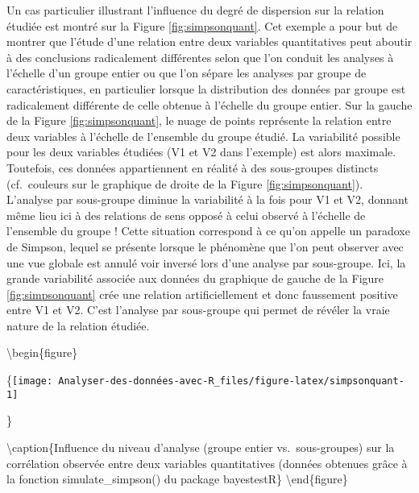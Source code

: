 \documentclass[
  french,
]{book}
\begin{document}
Un cas particulier illustrant l'influence du degré de dispersion sur la relation étudiée est montré sur la Figure \ref{fig:simpsonquant}. Cet exemple a pour but de montrer que l'étude d'une relation entre deux variables quantitatives peut aboutir à des conclusions radicalement différentes selon que l'on conduit les analyses à l'échelle d'un groupe entier ou que l'on sépare les analyses par groupe de caractéristiques, en particulier lorsque la distribution des données par groupe est radicalement différente de celle obtenue à l'échelle du groupe entier. Sur la gauche de la Figure \ref{fig:simpsonquant}, le nuage de points représente la relation entre deux variables à l'échelle de l'ensemble du groupe étudié. La variabilité possible pour les deux variables étudiées (V1 et V2 dans l'exemple) est alors maximale. Toutefois, ces données appartiennent en réalité à des sous-groupes distincts (cf.~couleurs sur le graphique de droite de la Figure \ref{fig:simpsonquant}). L'analyse par sous-groupe diminue la variabilité à la fois pour V1 et V2, donnant même lieu ici à des relations de sens opposé à celui observé à l'échelle de l'ensemble du groupe ! Cette situation correspond à ce qu'on appelle un paradoxe de Simpson, lequel se présente lorsque le phénomène que l'on peut observer avec une vue globale est annulé voir inversé lors d'une analyse par sous-groupe. Ici, la grande variabilité associée aux données du graphique de gauche de la Figure \ref{fig:simpsonquant} crée une relation artificiellement et donc faussement positive entre V1 et V2. C'est l'analyse par sous-groupe qui permet de révéler la vraie nature de la relation étudiée.

\textbackslash begin\{figure\}

\{\centering \texttt{[image: Analyser-des-données-avec-R\_files/figure-latex/simpsonquant-1]}

\}

\textbackslash caption\{Influence du niveau d'analyse (groupe entier vs.~sous-groupes) sur la corrélation observée entre deux variables quantitatives (données obtenues grâce à la fonction simulate\_simpson() du package bayestestR\}\label{fig:simpsonquant}
\textbackslash end\{figure\}
\end{document}
